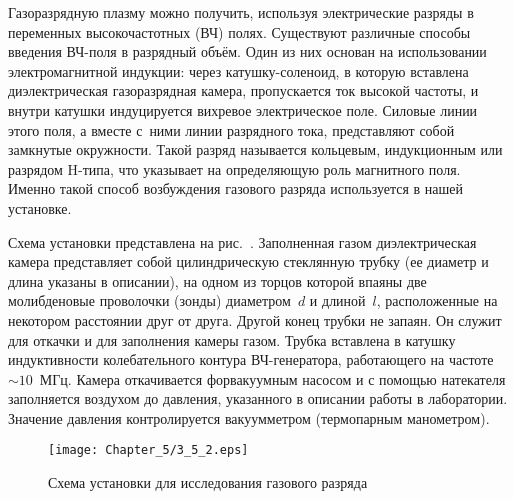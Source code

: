 



Газоразрядную плазму можно получить, используя электрические разряды в переменных высокочастотных (ВЧ) полях. Существуют
различные способы введения ВЧ-поля в разрядный объём. Один из них основан на использовании электромагнитной индукции:
через катушку-соленоид, в которую вставлена диэлектрическая газоразрядная камера, пропускается ток высокой частоты, и
внутри катушки индуцируется вихревое электрическое поле. Силовые линии этого поля, а вместе с~ними линии разрядного
тока, представляют собой замкнутые окружности. Такой разряд называется кольцевым, индукционным или разрядом H-типа,
что указывает на определяющую роль магнитного поля. Именно такой способ возбуждения газового разряда используется в нашей
установке.

\experiment
Схема установки представлена на рис.~. Заполненная газом диэлектрическая камера представляет собой цилиндрическую
стеклянную трубку (ее диаметр и длина указаны в описании), на одном из торцов которой впаяны две молибденовые проволочки (зонды)
диаметром~$d$ и длиной~$l$, расположенные на некотором расстоянии друг от друга. Другой конец трубки не запаян.
Он служит для откачки и для заполнения камеры газом. Трубка вставлена в катушку индуктивности колебательного контура
ВЧ-генератора, работающего на частоте~$\sim10$~МГц. Камера откачивается форвакуумным насосом и с помощью натекателя
заполняется воздухом до давления, указанного в описании работы в лаборатории. Значение давления контролируется вакуумметром
(термопарным манометром).

\begin{figure}[h!]
	\texttt{[image: Chapter\_5/3\_5\_2.eps]}
	\caption{Схема установки для исследования газового разряда}
\end{figure}

